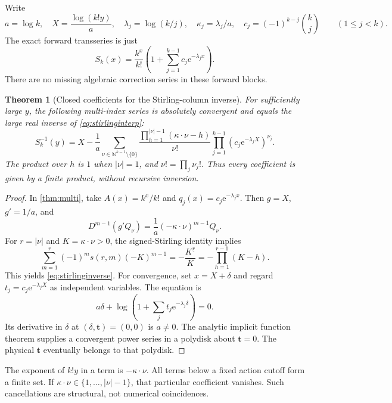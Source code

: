 \documentclass[11pt,a4paper]{article}
\newtheorem{theorem}{Theorem}[section]
\theoremstyle{definition}
\theoremstyle{remark}
\newcommand{\ee}{\mathrm e}
\newcommand{\NN}{\mathbb N}
\newcommand{\fall}[2]{#1^{\underline{#2}}}
\numberwithin{equation}{section}
\begin{document}
Write
\begin{equation}
 a=\log k,\quad X=\frac{\log(k!y)}a,\quad
 \lambda_j=\log(k/j),\quad \kappa_j=\lambda_j/a,\quad
 c_j=(-1)^{k-j}\binom kj \qquad(1\le j<k).
 \label{eq:stirlingparams}
\end{equation}
The exact forward transseries is just
\begin{equation}
 S_k(x)=\frac{k^x}{k!}\left(1+\sum_{j=1}^{k-1}c_j\ee^{-\lambda_jx}\right).
 \label{eq:stirlingforward}
\end{equation}
There are no missing algebraic correction series in these forward blocks.

\begin{theorem}[Closed coefficients for the Stirling-column inverse]
\label{thm:stirling}
For sufficiently large $y$, the following multi-index series is absolutely convergent and equals the large real inverse of \eqref{eq:stirlinginterp}:
\begin{equation}
 S_k^{-1}(y)=X-\frac1a\sum_{\nu\in\NN^{k-1}\setminus\{0\}}
 \frac{\displaystyle\prod_{h=1}^{|\nu|-1}(\kappa\cdot\nu-h)}{\nu!}
 \prod_{j=1}^{k-1}\left(c_j\ee^{-\lambda_jX}\right)^{\nu_j}.
 \label{eq:stirlinginverse}
\end{equation}
The product over $h$ is $1$ when $|\nu|=1$, and $\nu!=\prod_j\nu_j!$. Thus every coefficient is given by a finite product, without recursive inversion.
\end{theorem}
\begin{proof}
In \cref{thm:multi}, take $A(x)=k^x/k!$ and $q_j(x)=c_j\ee^{-\lambda_jx}$. Then $g=X$, $g'=1/a$, and
\[
 D^{m-1}(g'Q_\nu)=\frac1a(-\kappa\cdot\nu)^{m-1}Q_\nu.
\]
For $r=|\nu|$ and $K=\kappa\cdot\nu>0$, the signed-Stirling identity implies
\[
 \sum_{m=1}^r(-1)^m s(r,m)(-K)^{m-1}
 =-\frac{\fall Kr}{K}
 =-\prod_{h=1}^{r-1}(K-h).
\]
This yields \eqref{eq:stirlinginverse}. For convergence, set $x=X+\delta$ and regard $t_j=c_j\ee^{-\lambda_jX}$ as independent variables. The equation is
\[
 a\delta+\log\left(1+\sum_jt_j\ee^{-\lambda_j\delta}\right)=0.
\]
Its derivative in $\delta$ at $(\delta,\bm t)=(0,0)$ is $a\ne0$. The analytic implicit function theorem supplies a convergent power series in a polydisk about $\bm t=0$. The physical $\bm t$ eventually belongs to that polydisk.
\end{proof}

The exponent of $k!y$ in a term is $-\kappa\cdot\nu$. All terms below a fixed action cutoff form a finite set. If $\kappa\cdot\nu\in\{1,\ldots,|\nu|-1\}$, that particular coefficient vanishes. Such cancellations are structural, not numerical coincidences.
\end{document}
